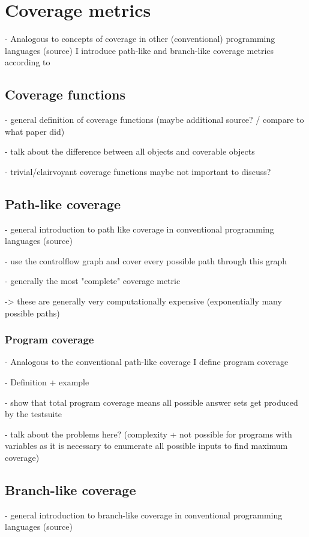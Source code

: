 \chapter{Coverage metrics}
\label{ch:Coverage metrics}
- Analogous to concepts of coverage in other (conventional) programming languages (source) I introduce path-like and branch-like coverage
metrics according to \textcite{Jan+10}

\section{Coverage functions}
\label{sec:Coverage metrics/Coverage functions}
- general definition of coverage functions (maybe additional source? / compare to what paper did)

- talk about the difference between all objects and coverable objects

- trivial/clairvoyant coverage functions maybe not important to discuss?

\section{Path-like coverage}
\label{sec:Coverage metrics/Path-like coverage}
- general introduction to path like coverage in conventional programming languages (source)

    - use the controlflow graph and cover every possible path through this graph

- generally the most "complete" coverage metric

-> these are generally very computationally expensive (exponentially many possible paths)

\subsection{Program coverage}
\label{subsec:Coverage metrics/Path-like coverage/Program coverage}
- Analogous to the conventional path-like coverage I define program coverage

- Definition + example

- show that total program coverage means all possible answer sets get produced by the testsuite

- talk about the problems here? (complexity + not possible for programs with variables as it is necessary to enumerate all 
possible inputs to find maximum coverage)

\section{Branch-like coverage}
\label{sec:Coverage metrics/Branch-like coverage}
- general introduction to branch-like coverage in conventional programming languages (source)

